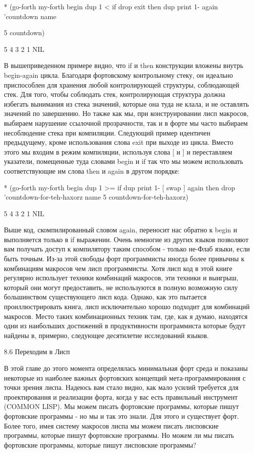 {{{* (go-forth my-forth
{ begin
dup 1 < if drop exit then
dup print
1-
again } ’countdown name

5 countdown)

5
4
3
2
1
NIL

В вышеприведенном примере видно, что if и then конструкции вложены внутрь begin-again цикла. Благодаря фортовскому контрольному стеку, он идеально приспособлен для хранения любой контролирующей структуры, соблюдающей стек. Для того, чтобы соблюдать стек, контролирующая структура должна избегать вынимания из стека значений, которые она туда не клала, и не оставлять значений по завершению. Но также как мы, при конструировании лисп макросов, выбираем нарушение ссылочной прозрачности, так и в форте мы часто выбираем несоблюдение стека при компиляции. Следующий пример идентичен предыдущему, кроме использования слова exit при выходе из цикла. Вместо этого мы входим в режим компиляции, используя слова [ и ] и переставляем указатели, помещенные туда словами begin и if так что мы можем использовать соответствующие им слова then и again в другом порядке: 

* (go-forth my-forth
{ begin
dup 1 >= if
dup print
1-
[ swap ] again
then
drop
} ’countdown-for-teh-haxorz name
5 countdown-for-teh-haxorz)

5
4
3
2
1
NIL

Выше код, скомпилированный словом again, переносит нас обратно к begin и выполняется только в if выражении. Очень немногие из других языков позволяют вам получать доступ к компилятору таким способом - только не-Флаб языки, если быть точным. Из-за этой свободы форт программисты иногда более привычны к комбинациям макросов чем лисп программисты. Хотя лисп код в этой книге регулярно использует техники комбинаций макросов, эти техники и выигрыш, который они могут предоставить, не используются в полную возможную силу большинством существующего лисп кода. Однако, как это пытается проиллюстрировать книга, лисп исключительно хорошо подходит для комбинаций макросов. Место таких комбинационных техник там, где, как я думаю, находятся одни из наибольших достижений в продуктивности программиста которые будут найдены в, примерно, следующее десятилетие исследований языков.

8.6 Переходим в Лисп

В этой главе до этого момента определялась минимальная форт среда и показаны некоторые из наиболее важных фортовских концепций мета-программирования с точки зрения лиспа. Надеюсь вам стало видно, как мало усилий требуется для проектирования и реализации форта, когда у вас есть правильный инструмент (COMMON LISP). Мы можем писать фортовские программы, которые пишут фортовские программы - но мы и так это знали. Для этого и существует форт. Более того, имея систему макросов лиспа мы можем писать лисповские программы, которые пишут фортовские программы. Но можем ли мы писать фортовские программы, которые пишут лисповские программы?

}}}
